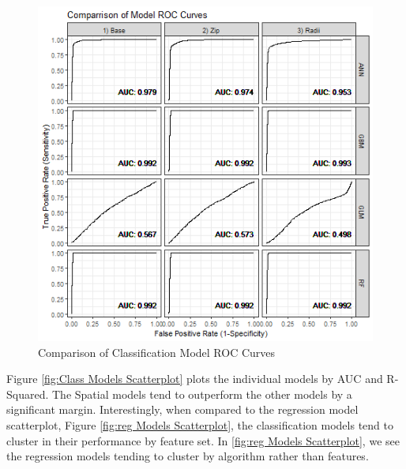 \documentclass[12pt,]{article}
\begin{document}
\begin{figure}[H]
\includegraphics[width=1\linewidth]{Sections/tables and figures/compare_model_roc_curves} \caption{Comparison of Classification Model ROC Curves}\label{fig:Model AUC Comparrison}
\end{figure}

\noindent Figure \ref{fig:Class Models Scatterplot} plots the individual
models by AUC and R-Squared. The Spatial models tend to outperform the
other models by a significant margin. Interestingly, when compared to
the regression model scatterplot, Figure
\ref{fig:reg Models Scatterplot}, the classification models tend to
cluster in their performance by feature set. In
\ref{fig:reg Models Scatterplot}, we see the regression models tending
to cluster by algorithm rather than features.
\end{document}
